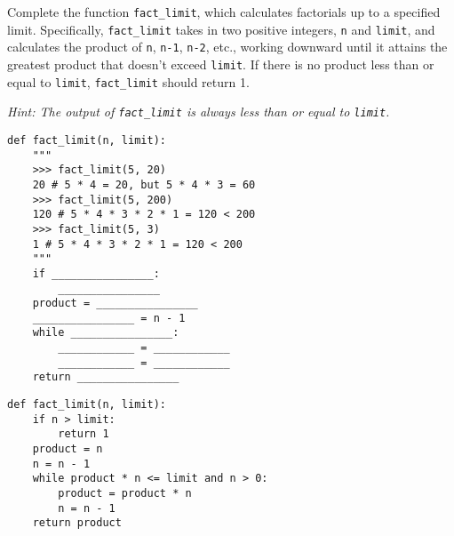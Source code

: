 \begin{blocksection}
\question Complete the function \lstinline{fact_limit}, which calculates factorials up to a specified limit. Specifically, \lstinline{fact_limit} takes in two positive integers, \lstinline{n} and \lstinline{limit}, and calculates the product of \lstinline{n}, \lstinline{n-1}, \lstinline{n-2}, etc., working downward until it attains the greatest product that doesn't exceed \lstinline{limit}. If there is no product less than or equal to \lstinline{limit}, \lstinline{fact_limit} should return 1. 

\emph{Hint: The output of \lstinline{fact_limit} is always less than or equal to \lstinline{limit}.}

\begin{lstlisting}
def fact_limit(n, limit):
    """
    >>> fact_limit(5, 20) 
    20 # 5 * 4 = 20, but 5 * 4 * 3 = 60
    >>> fact_limit(5, 200) 
    120 # 5 * 4 * 3 * 2 * 1 = 120 < 200
    >>> fact_limit(5, 3) 
    1 # 5 * 4 * 3 * 2 * 1 = 120 < 200
    """
    if ________________:
        ________________
    product = ________________
    ________________ = n - 1
    while ________________:
        ____________ = ____________  
        ____________ = ____________
    return ________________

\end{lstlisting}
\end{blocksection}

\begin{blocksection}
\begin{solution}
\begin{lstlisting}
def fact_limit(n, limit):
    if n > limit:
        return 1
    product = n
    n = n - 1
    while product * n <= limit and n > 0:
        product = product * n  
        n = n - 1
    return product
\end{lstlisting}
\end{solution}
\end{blocksection}
